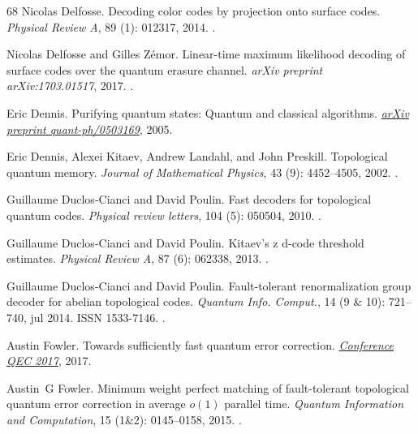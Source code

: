 \documentclass[a4paper, 10pt, accepted=2021-11-03]{quantumarticle}
\begin{document}
{\begin{thebibliography}{68}
Nicolas Delfosse.
\newblock Decoding color codes by projection onto surface codes.
\newblock \emph{Physical Review A}, 89 (1): 012317, 2014.
\newblock {}.

Nicolas Delfosse and Gilles Z{\'e}mor.
\newblock Linear-time maximum likelihood decoding of surface codes over the
  quantum erasure channel.
\newblock \emph{arXiv preprint arXiv:1703.01517}, 2017.
\newblock {}.

Eric Dennis.
\newblock Purifying quantum states: Quantum and classical algorithms.
\newblock \emph{\href{https://arxiv.org/abs/quant-ph/0503169}{arXiv preprint
  quant-ph/0503169}}, 2005.

Eric Dennis, Alexei Kitaev, Andrew Landahl, and John Preskill.
\newblock Topological quantum memory.
\newblock \emph{Journal of Mathematical Physics}, 43 (9):
  4452--4505, 2002.
\newblock {}.

Guillaume Duclos-Cianci and David Poulin.
\newblock Fast decoders for topological quantum codes.
\newblock \emph{Physical review letters}, 104 (5): 050504,
  2010.
\newblock {}.

Guillaume Duclos-Cianci and David Poulin.
\newblock Kitaev's z d-code threshold estimates.
\newblock \emph{Physical Review A}, 87 (6): 062338, 2013.
\newblock {}.

Guillaume Duclos-Cianci and David Poulin.
\newblock Fault-tolerant renormalization group decoder for abelian topological
  codes.
\newblock \emph{Quantum Info. Comput.}, 14 (9 \& 10):
  721–740, jul 2014.
\newblock ISSN 1533-7146.
\newblock {}.

Austin Fowler.
\newblock Towards sufficiently fast quantum error correction.
\newblock \emph{\href{https://qec2017.gatech.edu/}{Conference QEC 2017}}, 2017.

Austin~G Fowler.
\newblock Minimum weight perfect matching of fault-tolerant topological quantum
  error correction in average $ o (1) $ parallel time.
\newblock \emph{Quantum Information and Computation}, 15
  (1\&2): 0145--0158, 2015.
\newblock {}.


\end{thebibliography}}
\end{document}
